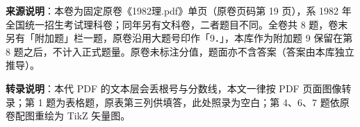 

\begin{gktip}
\textbf{来源说明}：本卷为固定原卷《1982理.pdf》单页（原卷页码第 19 页），系 1982 年全国统一招生考试理科卷；同年另有文科卷，二者题目不同。全卷共 8 题，卷末另有「附加题」栏一题，原卷沿用大题号印作「9．」，本库作为附加题 9 保留在第 8 题之后，不计入正式题量。原卷未标注分值，题面亦不含答案（答案由本库独立推导）。

\textbf{转录说明}：本代 PDF 的文本层会丢根号与分数线，本文一律按 PDF 页面图像转录；第 1 题为表格题，原表第三列供填答，此处照录为空白；第 4、6、7 题依原卷配图重绘为 TikZ 矢量图。
\end{gktip}

